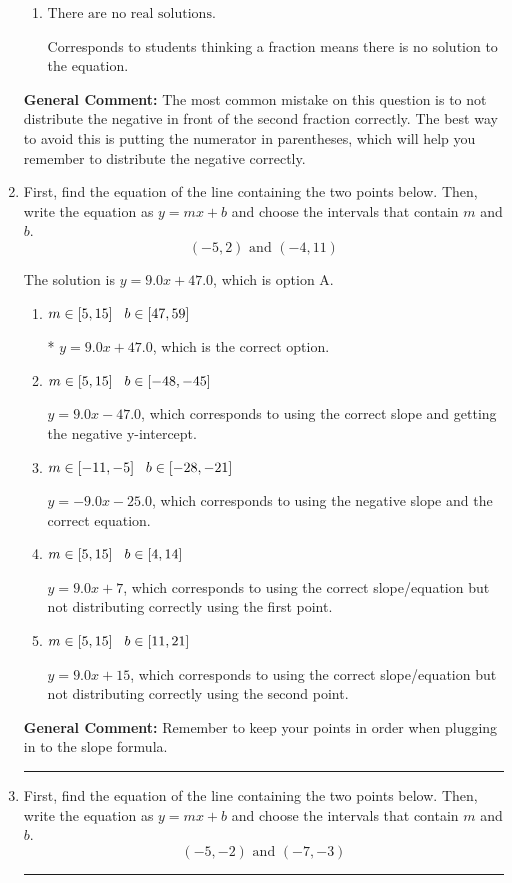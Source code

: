 \documentclass{extbook}[14pt]
\newcommand{\litem}[1]{\item #1

\rule{\textwidth}{0.4pt}}
\begin{document}
\begin{enumerate}
{\begin{enumerate}[label=\Alph*.]
$x = -0.759$, which corresponds to getting the negative of the actual solution.
\item \( \text{There are no real solutions.} \)

Corresponds to students thinking a fraction means there is no solution to the equation.
\end{enumerate}

\textbf{General Comment:} The most common mistake on this question is to not distribute the negative in front of the second fraction correctly. The best way to avoid this is putting the numerator in parentheses, which will help you remember to distribute the negative correctly.
}
\litem{
First, find the equation of the line containing the two points below. Then, write the equation as $ y=mx+b $ and choose the intervals that contain $m$ and $b$.
\[ (-5, 2) \text{ and } (-4, 11) \]

The solution is \( y = 9.0x + 47.0 \), which is option A.\begin{enumerate}[label=\Alph*.]
\item \( m \in [5, 15] \hspace*{3mm} b \in [47, 59] \)

* $y = 9.0x + 47.0$, which is the correct option.
\item \( m \in [5, 15] \hspace*{3mm} b \in [-48, -45] \)

 $y = 9.0x -47.0$, which corresponds to using the correct slope and getting the negative y-intercept.
\item \( m \in [-11, -5] \hspace*{3mm} b \in [-28, -21] \)

 $y = -9.0x -25.0$, which corresponds to using the negative slope and the correct equation.
\item \( m \in [5, 15] \hspace*{3mm} b \in [4, 14] \)

 $y = 9.0x + 7$, which corresponds to using the correct slope/equation but not distributing correctly using the first point.
\item \( m \in [5, 15] \hspace*{3mm} b \in [11, 21] \)

 $y = 9.0x + 15$, which corresponds to using the correct slope/equation but not distributing correctly using the second point.
\end{enumerate}

\textbf{General Comment:} Remember to keep your points in order when plugging in to the slope formula.
}
\litem{
First, find the equation of the line containing the two points below. Then, write the equation as $ y=mx+b $ and choose the intervals that contain $m$ and $b$.
\[ (-5, -2) \text{ and } (-7, -3) \]

}
\end{enumerate}
\end{document}
